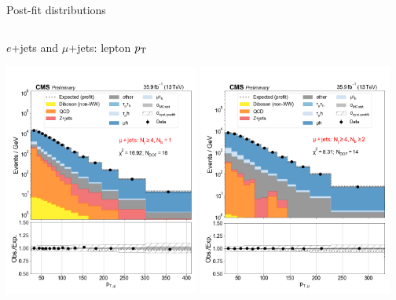 \begin{frame}{Post-fit distributions}
\begin{columns}
\begin{tcolorbox}{\smaller $e$+jets and $\mu$+jets: lepton $p_{\mathrm{T}}$}
\begin{center}
                \includegraphics[width=0.48\textwidth]{chapters/Analysis/sectionStatisticalAnalysis/figures/fit/mujet_cat_gt4_eq1}
                \includegraphics[width=0.48\textwidth]{chapters/Analysis/sectionStatisticalAnalysis/figures/fit/mujet_cat_gt4_gt2}
            \end{center}
        \end{tcolorbox}
    \end{columns}

\end{frame}

